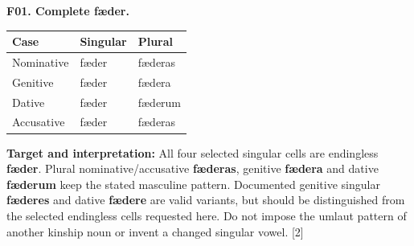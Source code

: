 \par\begin{minipage}{\linewidth}\raggedright
\textbf{F01. Complete fæder.}

\par\begingroup
\fontsize{10.5}{13.2}\selectfont
\setlength{\LTleft}{0pt}\setlength{\LTright}{\fill}
\noindent
\begin{tabular}{@{}>{\raggedright\arraybackslash}p{39.46mm}>{\raggedright\arraybackslash}p{39.46mm}>{\raggedright\arraybackslash}p{39.46mm}@{}}
\toprule
\textbf{Case} & \textbf{Singular} & \textbf{Plural} \\
\midrule
Nominative & fæder & fæderas \\
Genitive & fæder & fædera \\
Dative & fæder & fæderum \\
Accusative & fæder & fæderas \\
\bottomrule
\end{tabular}
\par\endgroup

\textbf{Target and interpretation:} All four selected singular cells are endingless \textbf{fæder}. Plural nominative/\allowbreak{}accusative \textbf{fæderas}, genitive \textbf{fædera} and dative \textbf{fæderum} keep the stated masculine pattern. Documented genitive singular \textbf{fæderes} and dative \textbf{fædere} are valid variants, but should be distinguished from the selected endingless cells requested here. Do not impose the umlaut pattern of another kinship noun or invent a changed singular vowel. [2]

\end{minipage}\par\addvspace{4pt}

